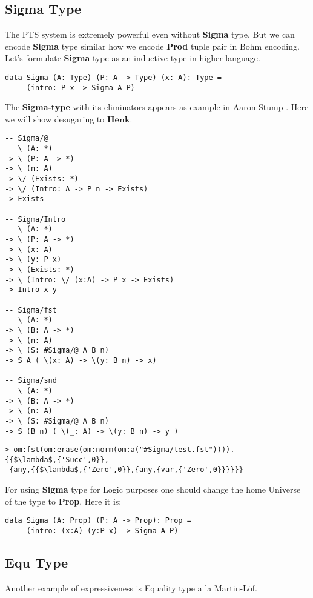 \documentclass{article}
\begin{document}
\subsection{Sigma Type}
The PTS system is extremely powerful even without {\bf Sigma} type.
But we can encode {\bf Sigma} type similar how we encode {\bf Prod} tuple pair in Bohm encoding.
Let's formulate {\bf Sigma} type as an inductive type in higher language.

\begin{lstlisting}
data Sigma (A: Type) (P: A -> Type) (x: A): Type =
     (intro: P x -> Sigma A P)
\end{lstlisting}

The {\bf Sigma-type} with its eliminators appears as example in Aaron Stump \cite{Stump17}.
Here we will show desugaring to $\mathbf{Henk}$.

\begin{lstlisting}
-- Sigma/@
   \ (A: *)
-> \ (P: A -> *)
-> \ (n: A)
-> \/ (Exists: *)
-> \/ (Intro: A -> P n -> Exists)
-> Exists

-- Sigma/Intro
   \ (A: *)
-> \ (P: A -> *)
-> \ (x: A)
-> \ (y: P x)
-> \ (Exists: *)
-> \ (Intro: \/ (x:A) -> P x -> Exists)
-> Intro x y

-- Sigma/fst
   \ (A: *)
-> \ (B: A -> *)
-> \ (n: A)
-> \ (S: #Sigma/@ A B n)
-> S A ( \(x: A) -> \(y: B n) -> x)

-- Sigma/snd
   \ (A: *)
-> \ (B: A -> *)
-> \ (n: A)
-> \ (S: #Sigma/@ A B n)
-> S (B n) ( \(_: A) -> \(y: B n) -> y )
\end{lstlisting}

\begin{lstlisting}[mathescape=true]
> om:fst(om:erase(om:norm(om:a("#Sigma/test.fst")))).
{{$\lambda$,{'Succ',0}},
 {any,{{$\lambda$,{'Zero',0}},{any,{var,{'Zero',0}}}}}}
\end{lstlisting}

For using {\bf Sigma} type for Logic purposes one should change the
home Universe of the type to {\bf Prop}. Here it is:

\begin{lstlisting}[mathescape=true]
data Sigma (A: Prop) (P: A -> Prop): Prop =
     (intro: (x:A) (y:P x) -> Sigma A P)
\end{lstlisting}

\subsection{Equ Type}
Another example of expressiveness is Equality type a la Martin-Löf.
\end{document}
